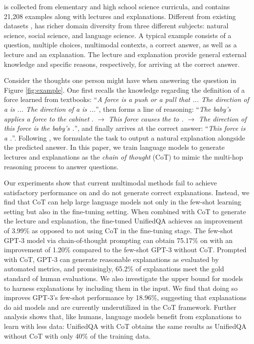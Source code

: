 \name{} is collected from elementary and high school science curricula, and contains 21,208 examples along with lectures and explanations. Different from existing datasets \cite{kembhavi2016diagram,kembhavi2017you,sampat2020visuo}, \name{} has richer domain diversity from three different subjects: natural science, social science, and language science. A typical example consists of a question, multiple choices, multimodal contexts, a correct answer, as well as a lecture and an explanation. The lecture and explanation provide general external knowledge and specific reasons, respectively, for arriving at the correct answer.

Consider the thoughts one person might have when answering the question in Figure \ref{fig:example}. One first recalls the knowledge regarding the definition of a force learned from textbooks: ``\textit{A force is a push or a pull that ... The direction of a  is ... The direction of a  is ...}'', then forms a line of reasoning: ``\textit{The baby's  applies a force to the cabinet }. $\rightarrow$  \textit{This force causes the  to .} $\rightarrow$ \textit{The direction of this force is  the baby's .}'', and finally arrives at the correct answer: ``\textit{This force is a .}''. Following \cite{narang2020wt5}, we formulate the task to output a natural explanation alongside the predicted answer. In this paper, we train language models to generate lectures and explanations as the \textit{chain of thought} (CoT) to mimic the multi-hop reasoning process to answer \name{} questions. 

Our experiments show that current multimodal methods \cite{yu2019mcan,Anderson2017up,Kim2018,gao2019dynamic,li2019visualbert,lu2021iconqa} fail to achieve satisfactory performance on \name{} and do not generate correct explanations. Instead, we find that CoT can help large language models not only in the few-shot learning setting but also in the fine-tuning setting.
When combined with CoT to generate the lecture and explanation, the fine-tuned UnifiedQA \cite{khashabi2020unifiedqa} achieves an improvement of 3.99\% as opposed to not using CoT in the fine-tuning stage. The few-shot GPT-3 model \cite{chen2020big} via chain-of-thought prompting can obtain 75.17\% on \name{} with an improvement of 1.20\% compared to the few-shot GPT-3 without CoT. Prompted with CoT, GPT-3 can generate reasonable explanations as evaluated by automated metrics, and promisingly, 65.2\% of explanations meet the gold standard of human evaluations. We also investigate the upper bound for models to harness explanations by including them in the input. We find that doing so improves GPT-3's few-shot performance by 18.96\%, suggesting that explanations do aid models and are currently underutilized in the CoT framework. Further analysis shows that, like humans, language models benefit from explanations to learn with less data: UnifiedQA with CoT obtains the same results as UnifiedQA without CoT with only 40\% of the training data.

